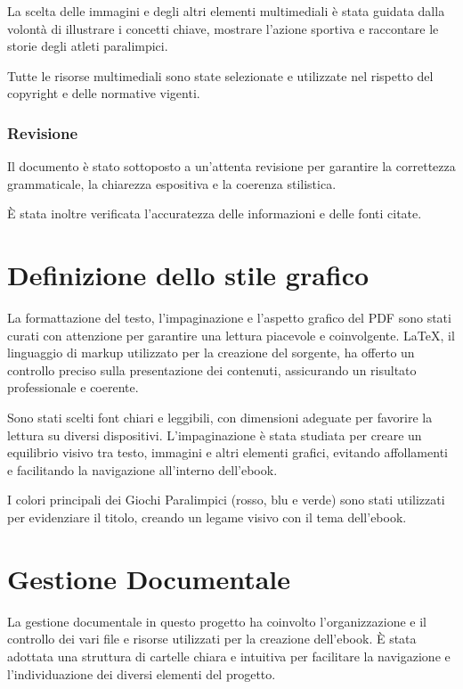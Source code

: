 \documentclass[a4paper,12pt]{report}
\begin{document}
La scelta delle immagini e degli altri elementi multimediali è stata guidata dalla volontà di illustrare i concetti chiave, mostrare l'azione sportiva e raccontare le storie degli atleti paralimpici. 

Tutte le risorse multimediali sono state selezionate e utilizzate nel rispetto del copyright e delle normative vigenti.

\subsubsection{Revisione}

Il documento è stato sottoposto a un'attenta revisione per garantire la correttezza grammaticale, la chiarezza espositiva e la coerenza stilistica. 

È stata inoltre verificata l'accuratezza delle informazioni e delle fonti citate.

\section{Definizione dello stile grafico}

La formattazione del testo, l'impaginazione e l'aspetto grafico del PDF sono stati curati con attenzione per garantire una lettura piacevole e coinvolgente. LaTeX, il linguaggio di markup utilizzato per la creazione del sorgente, ha offerto un controllo preciso sulla presentazione dei contenuti, assicurando un risultato professionale e coerente.

Sono stati scelti font chiari e leggibili, con dimensioni adeguate per favorire la lettura su diversi dispositivi. L'impaginazione è stata studiata per creare un equilibrio visivo tra testo, immagini e altri elementi grafici, evitando affollamenti e facilitando la navigazione all'interno dell'ebook. 

I colori principali dei Giochi Paralimpici (rosso, blu e verde) sono stati utilizzati per evidenziare il titolo, creando un legame visivo con il tema dell'ebook.

\section{Gestione Documentale}

La gestione documentale in questo progetto ha coinvolto l'organizzazione e il controllo dei vari file e risorse utilizzati per la creazione dell'ebook. È stata adottata una struttura di cartelle chiara e intuitiva per facilitare la navigazione e l'individuazione dei diversi elementi del progetto.
\end{document}
